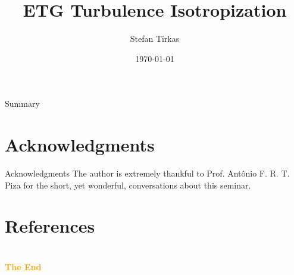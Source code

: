 \documentclass[aspectratio=43]{beamer}
\title{ETG Turbulence Isotropization}
\author[S. Tirkas]{Stefan Tirkas}
\institute[CIPS]{
    CIPS%
    \\%
    University of Colorado, Boulder%
}
\date{\today}
\begin{document}
    
    \frame{\titlepage}
    
    \begin{frame}{Summary}
        \tableofcontents
    \end{frame}

    \begin{frame}
        
    \end{frame}
    
    \section*{Acknowledgments} %
        \begin{frame}{Acknowledgments}
            The author is extremely thankful to Prof. Antônio F. R. T. Piza for the short, yet wonderful, conversations about this seminar.
        \end{frame}
    
    \section*{References} %

    \section{}
    \begin{frame}{}
        \centering
            \Huge\bfseries
        \textcolor{orange}{The End}
    \end{frame}
\end{document}
